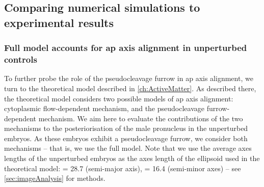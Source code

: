 
\subsection{Comparing numerical simulations to experimental results}\label{subsec:expVsTheoryPcFurrow}
\subsubsection{Full model accounts for \acs{ap} axis alignment in unperturbed controls}\label{subsubsec:fullModelForWT}
To further probe the role of the pseudocleavage furrow in \ac{ap} axis alignment, we turn to the theoretical model described in \autoref{ch:ActiveMatter}. As described there, the theoretical model considers two possible models of \ac{ap} axis alignment: cytoplasmic flow-dependent mechanism, and the pseudocleavage furrow-dependent mechanism. We aim here to evaluate the contributions of the two mechanisms to the posteriorisation of the male pronucleus in the unperturbed embryos. As these embryos exhibit a pseudocleavage furrow, we consider both mechanisms -- that is, we use the full model. Note that we use the average axes lengths of the unperturbed embryos as the axes length of the ellipsoid used in the theoretical model: \longAxisLength = \SI{28.7}{\unitLength} (semi-major axis), \shortAxisLength = \SI{16.4}{\unitLength} (semi-minor axes) -- see \autoref{sec:imageAnalysis} for methods.

